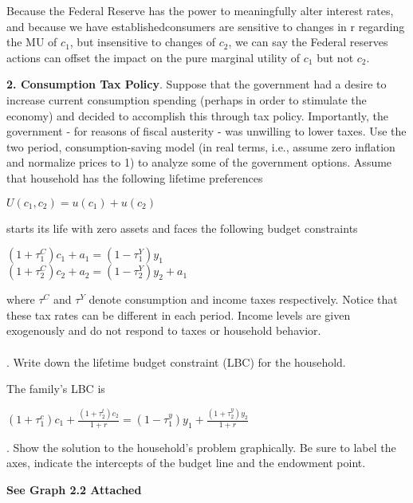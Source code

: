 \documentclass[11pt]{SelfArxOneColBMN}
\begin{document}
\begin{solution}
  Because the Federal Reserve has the power to meaningfully alter interest rates, and because we have establishedconsumers are sensitive to changes in r regarding the MU of $c_1$, but insensitive to changes of $c_2$, we can say the Federal reserves actions can offset the impact on the pure marginal utility of $c_1$ but not $c_2$. 
\end{solution}
\bigskip
\noindent \textbf{2. Consumption Tax Policy}. Suppose that the government had a desire to increase current consumption spending (perhaps in order to stimulate the economy) and decided to accomplish this through tax policy. Importantly, the government - for reasons of fiscal austerity - was unwilling to lower taxes. Use the two period, consumption-saving model (in real terms, i.e., assume zero inflation and normalize prices to 1) to analyze some of the government options. Assume that household has the following lifetime preferences
\begin{center}
	$U(c_1,c_2) = u(c_1) + u(c_2)$
\end{center}
starts its life with zero assets and faces the following budget constraints
\begin{center}
	$(1 + \tau_1^C)c_1 + a_1 = (1 - \tau_1^Y)y_1$\\
	$(1 + \tau_2^C)c_2 + a_2 = (1 - \tau_2^Y)y_2 + a_1$
\end{center}
where $\tau^C$ and $\tau^Y$ denote consumption and income taxes respectively. Notice that these tax rates can be different in each period. Income levels are given exogenously and do not respond to taxes or household behavior.\\
\\
. Write down the lifetime budget constraint (LBC) for the household.\\
\begin{solution}
The family's LBC is
  \begin{center}
    $(1 + \tau_1^c)c_1 + \frac{(1 + \tau_2^t)c_2}{1 + r} = (1 - \tau_1^y)y_1 + \frac{(1 + \tau_2^y)y_2}{1 + r}$
  \end{center}
\end{solution}
. Show the solution to the household's problem graphically. Be sure to label the axes, indicate the intercepts of the budget line and the endowment point.\\
\begin{solution}
  \begin{center}
    \textbf{See Graph 2.2 Attached}
  \end{center}
\end{solution}
\end{document}
